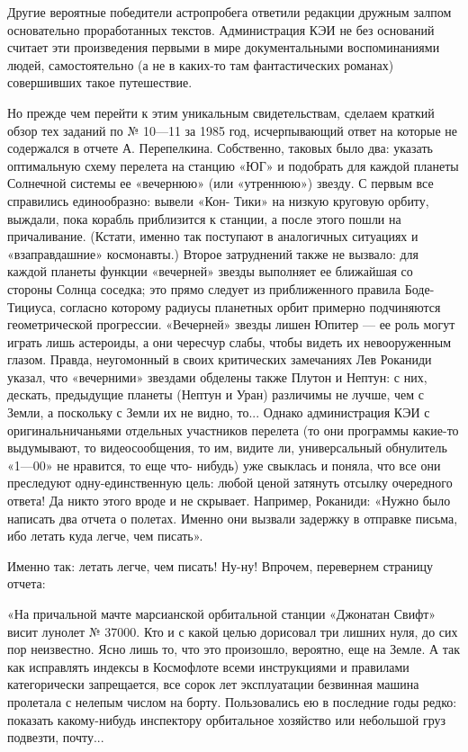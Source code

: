 \documentclass[11pt,a4paper,oneside]{article}
\begin{document}
Другие вероятные победители астропробега ответили редакции дружным залпом основательно проработанных текстов. Администрация КЭИ не без оснований считает эти произведения первыми в мире документальными воспоминаниями людей, самостоятельно (а не в каких-то там фантастических романах) совершивших такое путешествие.

Но прежде чем перейти к этим уникальным свидетельствам, сделаем краткий обзор тех заданий по № 10—11 за 1985 год, исчерпывающий ответ на которые не содержался в отчете А. Перепелкина. Собственно, таковых было два: указать оптимальную схему перелета на станцию «ЮГ» и подобрать для каждой планеты Солнечной системы ее «вечернюю» (или «утреннюю») звезду. С первым все справились единообразно: вывели «Кон- Тики» на низкую круговую орбиту, выждали, пока корабль приблизится к станции, а после этого пошли на причаливание. (Кстати, именно так поступают в аналогичных ситуациях и «взаправдашние» космонавты.) Второе затруднений также не вызвало: для каждой планеты функции «вечерней» звезды выполняет ее ближайшая со стороны Солнца соседка; это прямо следует из приближенного правила Боде-Тициуса, согласно которому радиусы планетных орбит примерно подчиняются геометрической прогрессии. «Вечерней» звезды лишен Юпитер — ее роль могут играть лишь астероиды, а они чересчур слабы, чтобы видеть их невооруженным глазом. Правда, неугомонный в своих критических замечаниях Лев Роканиди указал, что «вечерними» звездами обделены также Плутон и Нептун: с них, дескать, предыдущие планеты (Нептун и Уран) различимы не лучше, чем с Земли, а поскольку с Земли их не видно, то... Однако администрация КЭИ с оригинальничаньями отдельных участников перелета (то они программы какие-то выдумывают, то видеосообщения, то им, видите ли, универсальный обнулитель «1—00» не нравится, то еще что- нибудь) уже свыклась и поняла, что все они преследуют одну-единственную цель: любой ценой затянуть отсылку очередного ответа! Да никто этого вроде и не скрывает. Например, Роканиди: «Нужно было написать два отчета о полетах. Именно они вызвали задержку в отправке письма, ибо летать куда легче, чем писать».

Именно так: летать легче, чем писать! Ну-ну! Впрочем, перевернем страницу отчета:

«На причальной мачте марсианской орбитальной станции «Джонатан Свифт» висит лунолет № 37000. Кто и с какой целью дорисовал три лишних нуля, до сих пор неизвестно. Ясно лишь то, что это произошло, вероятно, еще на Земле. А так как исправлять индексы в Космофлоте всеми инструкциями и правилами категорически запрещается, все сорок лет эксплуатации безвинная машина пролетала с нелепым числом на борту. Пользовались ею в последние годы редко: показать какому-нибудь инспектору орбитальное хозяйство или небольшой груз подвезти, почту...
\end{document}
